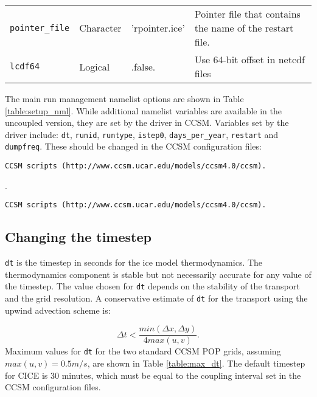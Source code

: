 \begin{table}[ht]
\begin{center}
\begin{tabular}{p{2.0cm}p{2.0cm}p{4.0cm}p{6.5cm}}
{\tt pointer\_file} & Character & 'rpointer.ice' & Pointer file that
                                   contains the name of the restart file. \\

{\tt lcdf64}&  Logical  & .false. & Use 64-bit offset in netcdf files \\

  \hline
  \end{tabular}
  \end{center}
\end{table}

The main run management namelist options are shown in Table 
\ref{table:setup_nml}. While additional namelist variables are available in
the uncoupled version, they are set by the driver in CCSM. Variables set by
the driver include: {\tt dt}, {\tt runid}, {\tt runtype}, {\tt istep0}, 
{\tt days\_per\_year}, {\tt restart} and {\tt dumpfreq}. These should be 
changed in the CCSM configuration files:

\ifpdf
  {\tt CCSM scripts (http://www.ccsm.ucar.edu/models/ccsm4.0/ccsm).}
\else
\begin{htmlonly}
  .
\end{htmlonly}
\begin{latexonly}
  {\tt CCSM scripts (http://www.ccsm.ucar.edu/models/ccsm4.0/ccsm).}
\end{latexonly}
\fi

\subsection{Changing the timestep}
\label{setup_nml_mgmt}

{\tt dt} is the timestep in seconds for the ice model thermodynamics.
The thermodynamics component is stable but not necessarily accurate for any 
value of the timestep.  The value chosen for {\tt dt} depends on the stability 
of the transport and the grid resolution.  A conservative estimate of {\tt dt} 
for the transport using the upwind advection scheme is:

\begin{equation}
  \Delta t < \frac{min(\Delta x, \Delta y)}{4 max(u, v)} .
\end{equation}
Maximum values for {\tt dt} for the two standard CCSM POP grids, assuming 
$max(u,v) = 0.5 m/s$, are shown in Table \ref{table:max_dt}.  The default
timestep for CICE is 30 minutes, which must be equal to the coupling interval
set in the CCSM configuration files.

